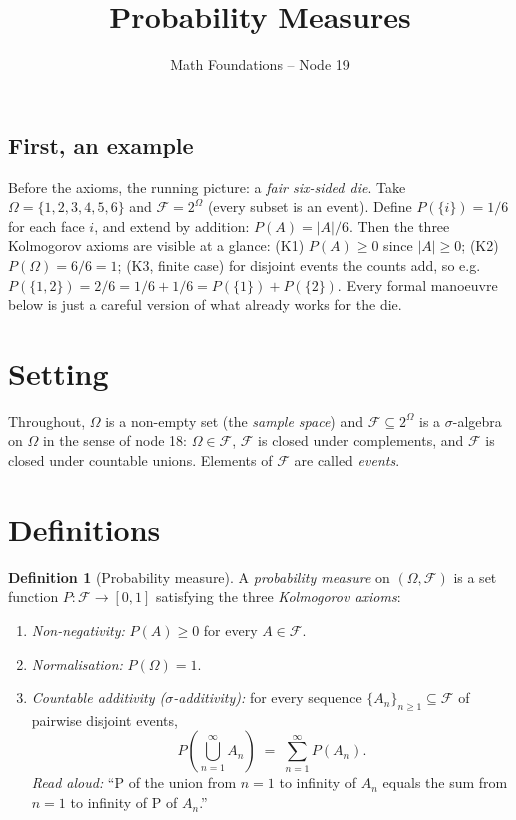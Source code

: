 \documentclass[11pt]{article}
\title{Probability Measures}
\author{Math Foundations -- Node 19}
\date{}
\theoremstyle{definition}
\newtheorem{definition}[theorem]{Definition}
\theoremstyle{remark}
\newcommand{\F}{\mathcal{F}}
\newcommand{\Om}{\Omega}
\begin{document}
\maketitle

\subsection*{First, an example}

Before the axioms, the running picture: a \emph{fair six-sided die}.
Take $\Om = \{1, 2, 3, 4, 5, 6\}$ and $\F = 2^{\Om}$ (every subset is an event).
Define $P(\{i\}) = 1/6$ for each face $i$, and extend by addition:
$P(A) = |A|/6$.
Then the three Kolmogorov axioms are visible at a glance:
(K1) $P(A) \geq 0$ since $|A| \geq 0$;
(K2) $P(\Om) = 6/6 = 1$;
(K3, finite case) for disjoint events the counts add, so e.g.
$P(\{1,2\}) = 2/6 = 1/6 + 1/6 = P(\{1\}) + P(\{2\})$.
Every formal manoeuvre below is just a careful version of what already works for the die.

\section{Setting}

Throughout, $\Om$ is a non-empty set (the \emph{sample space}) and
$\F \subseteq 2^{\Om}$ is a $\sigma$-algebra on $\Om$ in the sense of node 18:
$\Om \in \F$, $\F$ is closed under complements, and $\F$ is closed under
countable unions. Elements of $\F$ are called \emph{events}.

\section{Definitions}

\begin{definition}[Probability measure]
A \emph{probability measure} on $(\Om, \F)$ is a set function $P : \F \to [0,1]$
satisfying the three \emph{Kolmogorov axioms}:
\begin{enumerate}
    \item[\textnormal{(K1)}] \emph{Non-negativity:} $P(A) \geq 0$ for every $A \in \F$.
    \item[\textnormal{(K2)}] \emph{Normalisation:} $P(\Om) = 1$.
    \item[\textnormal{(K3)}] \emph{Countable additivity ($\sigma$-additivity):} for every sequence
    $\{A_n\}_{n \geq 1} \subseteq \F$ of pairwise disjoint events,
    \[
        P\!\left( \bigcup_{n=1}^{\infty} A_n \right)
        \;=\; \sum_{n=1}^{\infty} P(A_n).
    \]
    \emph{Read aloud:} ``P of the union from $n=1$ to infinity of $A_n$ equals the sum from $n=1$ to infinity of P of $A_n$.''
\end{enumerate}
\end{definition}
\end{document}
